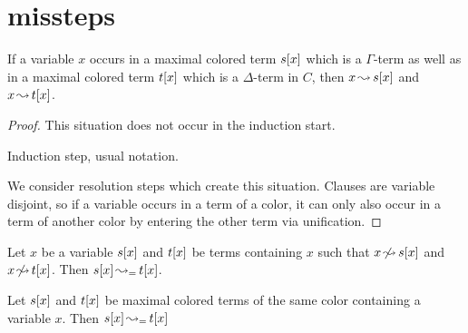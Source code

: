 \documentclass[,%
	paper=a4,%
	DIV10, %
	twoside=false,%
	liststotoc,
	bibtotoc,
	draft=false,%
	numbers=noendperiod
]{scrartcl}
\begin{document}
\section{missteps}
\begin{clemma}
	\label{lemma:arrow_from_one_color_to_other_color}
	If a variable $x$ occurs in a maximal colored term $s[x]$ which is a $\Gamma$-term as well as in a maximal colored term $t[x]$ which is a $\Delta$-term in $C$, then $x\operatorname{\leadsto} s[x]$ and $x\operatorname{\leadsto} t[x]$.
\end{clemma}
\begin{proof}
	This situation does not occur in the induction start.

	Induction step, usual notation.

	We consider resolution steps which create this situation. 
	Clauses are variable disjoint, so if a variable occurs in a term of a color, it can only also occur in a term of another color by entering the other term via unification.

\end{proof}


\begin{clemma}
	\label{wrong:same_color2}
	Let $x$ be a variable $s[x]$ and $t[x]$ be terms containing $x$ such that $x\operatorname{\not\leadsto} s[x]$ and $x\operatorname{\not\leadsto} t[x]$.
	\label{lemma:merge_arrow_between_same_colored_terms}
	Then $s[x] \operatorname{\leadsto_=} t[x]$.
\end{clemma}

\begin{clemma}
	\label{wrong:same_color}
	Let $s[x]$ and $t[x]$ be maximal colored terms of the same color containing a variable $x$. 
	Then $s[x] \operatorname{\leadsto_=} t[x]$
\end{clemma}
\end{document}
